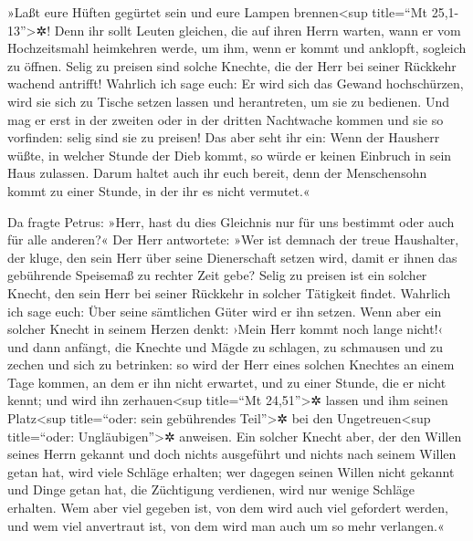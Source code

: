  »Laßt eure Hüften gegürtet sein und eure Lampen
brennen\textless sup title=``Mt 25,1-13''\textgreater✲! 
Denn ihr sollt Leuten gleichen, die auf ihren Herrn warten, wann er vom
Hochzeitsmahl heimkehren werde, um ihm, wenn er kommt und anklopft,
sogleich zu öffnen.  Selig zu preisen sind solche
Knechte, die der Herr bei seiner Rückkehr wachend antrifft! Wahrlich ich
sage euch: Er wird sich das Gewand hochschürzen, wird sie sich zu Tische
setzen lassen und herantreten, um sie zu bedienen.  Und
mag er erst in der zweiten oder in der dritten Nachtwache kommen und sie
so vorfinden: selig sind sie zu preisen!  Das aber seht
ihr ein: Wenn der Hausherr wüßte, in welcher Stunde der Dieb kommt, so
würde er keinen Einbruch in sein Haus zulassen.  Darum
haltet auch ihr euch bereit, denn der Menschensohn kommt zu einer
Stunde, in der ihr es nicht vermutet.«

 Da fragte Petrus: »Herr, hast du dies Gleichnis nur für
uns bestimmt oder auch für alle anderen?«  Der Herr
antwortete: »Wer ist demnach der treue Haushalter, der kluge, den sein
Herr über seine Dienerschaft setzen wird, damit er ihnen das gebührende
Speisemaß zu rechter Zeit gebe?  Selig zu preisen ist ein
solcher Knecht, den sein Herr bei seiner Rückkehr in solcher Tätigkeit
findet.  Wahrlich ich sage euch: Über seine sämtlichen
Güter wird er ihn setzen.  Wenn aber ein solcher Knecht
in seinem Herzen denkt: ›Mein Herr kommt noch lange nicht!‹ und dann
anfängt, die Knechte und Mägde zu schlagen, zu schmausen und zu zechen
und sich zu betrinken:  so wird der Herr eines solchen
Knechtes an einem Tage kommen, an dem er ihn nicht erwartet, und zu
einer Stunde, die er nicht kennt; und wird ihn zerhauen\textless sup
title=``Mt 24,51''\textgreater✲ lassen und ihm seinen Platz\textless sup
title=``oder: sein gebührendes Teil''\textgreater✲ bei den
Ungetreuen\textless sup title=``oder: Ungläubigen''\textgreater✲
anweisen.  Ein solcher Knecht aber, der den Willen seines
Herrn gekannt und doch nichts ausgeführt und nichts nach seinem Willen
getan hat, wird viele Schläge erhalten;  wer dagegen
seinen Willen nicht gekannt und Dinge getan hat, die Züchtigung
verdienen, wird nur wenige Schläge erhalten. Wem aber viel gegeben ist,
von dem wird auch viel gefordert werden, und wem viel anvertraut ist,
von dem wird man auch um so mehr verlangen.«

